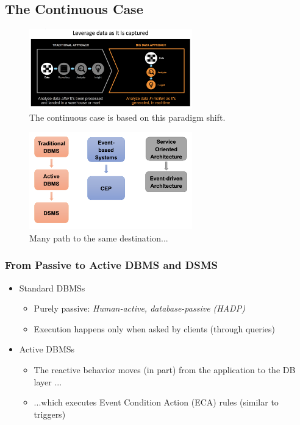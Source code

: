 \documentclass[10pt,a4paper]{article}
\begin{document}
\subsection{The Continuous Case}
\begin{figure}[ht!]
 \hfill \includegraphics[width=200pt]{images/continuous-paradigm.png}\hspace*{\fill}
 \caption{The continuous case is based on this paradigm shift.}
\end{figure}  

\begin{figure}[ht!]
 \hfill \includegraphics[width=200pt]{images/continuous-path.png}\hspace*{\fill}
 \caption{Many path to the same destination...}
\end{figure}  

\subsubsection{From Passive to Active DBMS and DSMS}
\begin{itemize}
	\item Standard DBMSs
	\begin{itemize}
		\item Purely passive: \textit{Human-active, database-passive (HADP)}
		\item Execution happens only when asked by clients (through queries)
	\end{itemize}
	\item Active DBMSs
	\begin{itemize}
		\item The reactive behavior moves (in part) from the application to the DB layer ...
		\item ...which executes Event Condition Action (ECA) rules (similar to triggers)
	\end{itemize}
\end{itemize}
\end{document}
